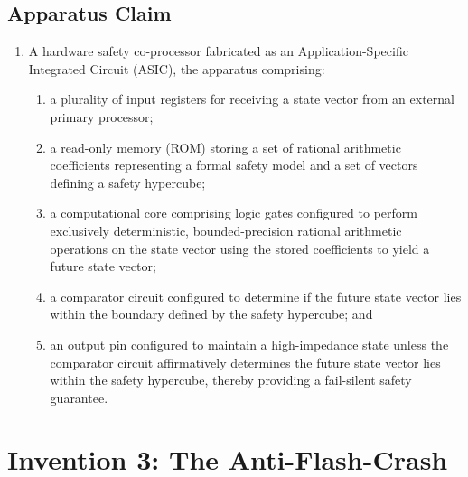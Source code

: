 \documentclass{article}
\begin{document}
\subsection*{Apparatus Claim}
\begin{enumerate}
    \item A hardware safety co-processor fabricated as an Application-Specific Integrated Circuit (ASIC), the apparatus comprising:
    \begin{enumerate}
        \item a plurality of input registers for receiving a state vector from an external primary processor;
        \item a read-only memory (ROM) storing a set of rational arithmetic coefficients representing a formal safety model and a set of vectors defining a safety hypercube;
        \item a computational core comprising logic gates configured to perform exclusively deterministic, bounded-precision rational arithmetic operations on the state vector using the stored coefficients to yield a future state vector;
        \item a comparator circuit configured to determine if the future state vector lies within the boundary defined by the safety hypercube; and
        \item an output pin configured to maintain a high-impedance state unless the comparator circuit affirmatively determines the future state vector lies within the safety hypercube, thereby providing a fail-silent safety guarantee.
    \end{enumerate}
\end{enumerate}

\newpage
\section{Invention 3: The Anti-Flash-Crash}
\end{document}
